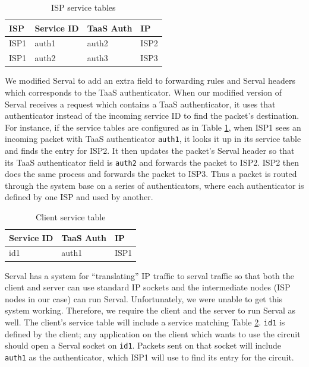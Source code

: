 \documentclass{article}
\begin{document}
\begin{table}
\centering
\begin{tabular}{| l | l | l | l | }
  \hline
  ISP & Service ID & TaaS Auth & IP \\ \hline
  ISP1 & auth1 & auth2 & ISP2 \\ \hline
  ISP1 & auth2 & auth3 & ISP3 \\ \hline
\end{tabular}
\caption{ISP service tables}
\label{table:servicetables}
\end{table}

We modified Serval to add an extra field to forwarding rules and
Serval headers which corresponds to the TaaS authenticator. When our
modified version of Serval receives a request which contains a TaaS
authenticator, it uses that authenticator instead of the incoming
service ID to find the packet's destination. For instance, if the
service tables are configured as in Table \ref{table:servicetables},
when ISP1 sees an incoming packet with TaaS authenticator
\texttt{auth1}, it looks it up in its service table and finds the
entry for ISP2. It then updates the packet's Serval header so that its
TaaS authenticator field is \texttt{auth2} and forwards the packet to
ISP2. ISP2 then does the same process and forwards the packet to
ISP3. Thus a packet is routed through the system base on a series of
authenticators, where each authenticator is defined by one ISP and
used by another.

\begin{table}
\centering
\begin{tabular}{| l | l | l | }
  \hline
  Service ID & TaaS Auth & IP \\ \hline
  id1 & auth1 & ISP1 \\ \hline
\end{tabular}
\caption{Client service table}
\label{table:clientservice}
\end{table}

Serval has a system for ``translating'' IP traffic to serval traffic
so that both the client and server can use standard IP sockets and the
intermediate nodes (ISP nodes in our case) can run
Serval. Unfortunately, we were unable to get this system
working. Therefore, we require the client and the server to run Serval
as well. The client's service table will include a service matching
Table \ref{table:clientservice}. \texttt{id1} is defined by the
client; any application on the client which wants to use the circuit
should open a Serval socket on \texttt{id1}. Packets sent on that
socket will include \texttt{auth1} as the authenticator, which ISP1
will use to find its entry for the circuit.
\end{document}
